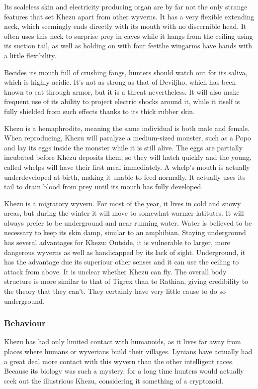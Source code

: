 Its scaleless skin and electricity producing organ are by far not the only strange features that set Khezu apart from other wyverns. It has a very flexible extending neck, which seemingly ends directly with its mouth with no discernible head. It often uses this neck to surprise prey in caves while it hangs from the ceiling using its suction tail, as well as holding on with four feet\hbNone the wingarms have hands with a little flexibility.

Becides its mouth full of crushing fangs, hunters should watch out for its saliva, which is highly acidic. It's not as strong as that of Deviljho, which has been known to eat through armor, but it is a threat nevertheless. It will also make frequent use of its ability to project electric shocks around it, while it itself is fully shielded from such effects thanks to its thick rubber skin.

Khezu is a hemaphrodite, meaning the same individual is both male and female. When reproducing, Khezu will paralyze a medium-sized monster, such as a Popo and lay its eggs inside the monster while it is still alive. The eggs are partially incubated before Khezu deposits them, so they will hatch quickly and the young, called whelps will have their first meal immediately. A whelp's mouth is actually underdeveloped at birth, making it unable to feed normally. It actually uses its tail to drain blood from prey until its mouth has fully developed.

Khezu is a migratory wyvern. For most of the year, it lives in cold and snowy areas, but during the winter it will move to somewhat warmer latitutes. It will always prefer to be underground and near running water. Water is believed to be necessary to keep its skin damp, similar to an amphibian. Staying underground has several advantages for Khezu: Outside, it is vulnerable to larger, more dangerous wyverns as well as handicapped by its lack of sight. Underground, it has the advantage due its superiour other senses and it can use the ceiling to attack from above. It is unclear whether Khezu can fly. The overall body structure is more similar to that of Tigrex than to Rathian, giving credibility to the theory that they can't. They certainly have very little cause to do so underground.

\subsubsection{Behaviour}
Khezu has had only limited contact with humanoids, as it lives far away from places where humans or wyverians build their villages. Lynians have actually had a great deal more contact with this wyvern than the other intelligent races. Because its biology was such a mystery, for a long time hunters would actually seek out the illustrious Khezu, considering it something of a cryptozoid.

